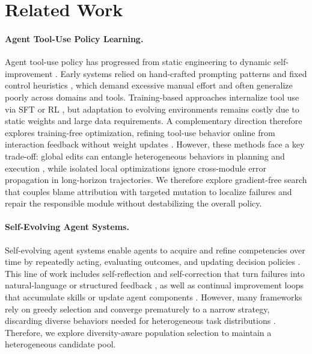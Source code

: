 \documentclass[11pt]{article}
\begin{document}
    




\section{Related Work}
\paragraph{Agent Tool-Use Policy Learning.} Agent tool-use policy has progressed from static engineering to dynamic self-improvement \cite{jiang2025adaptation}. Early systems relied on hand-crafted prompting patterns and fixed control heuristics \cite{yao2022react,wei2022chain, wang-etal-2023-plan, shen2023hugginggpt, lu2025octotools}, which demand excessive manual effort and often generalize poorly across domains and tools. Training-based approaches internalize tool use via SFT \cite{schick2023toolformer, patil2024gorilla} or RL \cite{qian2025toolrl, feng2025retool}, but adaptation to evolving environments remains costly due to static weights and large data requirements.
A complementary direction therefore explores training-free optimization, refining tool-use behavior online from interaction feedback without weight updates \cite{ramnath-etal-2025-systematic}. However, these methods face a key trade-off: global edits can entangle heterogeneous behaviors in planning and execution \cite{yang2023large, guo2023connecting}, while isolated local optimizations \cite{qu2024exploration,du2024anytool,yuan2025easytool} ignore cross-module error propagation in long-horizon trajectories. We therefore explore gradient-free search that couples blame attribution with targeted mutation to localize failures and repair the responsible module without destabilizing the overall policy.



\paragraph{Self-Evolving Agent Systems.} Self-evolving agent systems enable agents to acquire and refine competencies over time by repeatedly acting, evaluating outcomes, and updating decision policies \cite{gao2025survey, fang2025comprehensive}. This line of work includes self-reflection and self-correction \cite{madaan2023self, shinn2023reflexion} that turn failures into natural-language or structured feedback \cite{yuksekgonul2024textgrad,agrawal2025gepa}, as well as continual improvement loops that accumulate skills or update agent components \cite{khattab2023dspy,hu2024automated}. However, many frameworks rely on greedy selection and converge prematurely to a narrow strategy, discarding diverse behaviors needed for heterogeneous task distributions \cite{fernando2023promptbreeder}. Therefore, we explore diversity-aware population selection to maintain a heterogeneous candidate pool.
\end{document}

